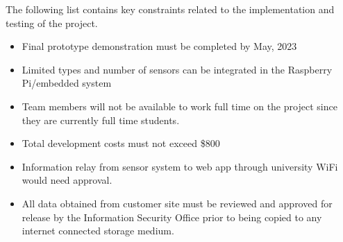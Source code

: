 The following list contains key constraints related to the implementation and testing of the project.

\begin{itemize}
  \item Final prototype demonstration must be completed by May, 2023
  \item Limited types and number of sensors can be integrated in the Raspberry Pi/embedded system
  \item Team members will not be available to work full time on the project since they are currently full time students.
  \item Total development costs must not exceed \$800
  \item Information relay from sensor system to web app through university WiFi would need approval.
  \item All data obtained from customer site must be reviewed and approved for release by the Information Security Office prior to being copied to any internet connected storage medium.
\end{itemize}

